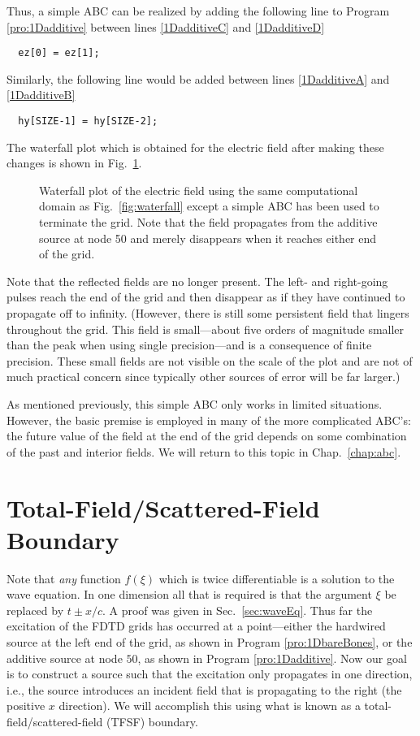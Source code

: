 Thus, a simple ABC can be realized by adding the following line to
Program \ref{pro:1Dadditive} between lines \ref{1DadditiveC} and
\ref{1DadditiveD}
\begin{verbatim}
  ez[0] = ez[1];
\end{verbatim}
Similarly, the following line would be added between lines
\ref{1DadditiveA} and \ref{1DadditiveB}
\begin{verbatim}
  hy[SIZE-1] = hy[SIZE-2];
\end{verbatim}
The waterfall plot which is obtained for the electric field after
making these changes is shown in Fig.\ \ref{fig:waterfallABC}.
\begin{figure}
  \begin{center}
  \end{center}
  \caption{Waterfall plot of the electric field using the same
    computational domain as Fig.\ \ref{fig:waterfall} except a simple
    ABC has been used to terminate the grid.  Note that the field
    propagates from the additive source at node 50 and merely
    disappears when it reaches either end of the grid.}
  \label{fig:waterfallABC}
\end{figure}
Note that the reflected fields are no longer present.  The left- and
right-going pulses reach the end of the grid and then disappear as if
they have continued to propagate off to infinity.  (However, there is
still some persistent field that lingers throughout the grid.  This
field is small---about five orders of magnitude smaller than the peak
when using single precision---and is a consequence of finite
precision.  These small fields are not visible on the scale of the
plot and are not of much practical concern since typically other
sources of error will be far larger.)

As mentioned previously, this simple ABC only works in limited
situations.  However, the basic premise is employed in many of the
more complicated ABC's: the future value of the field at the end of the
grid depends on some combination of the past and interior fields.  We
will return to this topic in Chap.\ \ref{chap:abc}.

\section{Total-Field/Scattered-Field Boundary \label{sec:tfsf}}

Note that {\em any} function $f(\xi)$ which is twice differentiable is
a solution to the wave equation.  In one dimension all that is
required is that the argument $\xi$ be replaced by $t\pm x/c$.  A
proof was given in Sec.\ \ref{sec:waveEq}.  Thus far the excitation of
the FDTD grids has occurred at a point---either the hardwired source
at the left end of the grid, as shown in Program
\ref{pro:1DbareBones}, or the additive source at node $50$, as shown
in Program \ref{pro:1Dadditive}.  Now our goal is to construct a
source such that the excitation only propagates in one direction,
i.e., the source introduces an incident field that is propagating to
the right (the positive $x$ direction).  We will accomplish this using
what is known as a total-field/scattered-field (TFSF) boundary.

